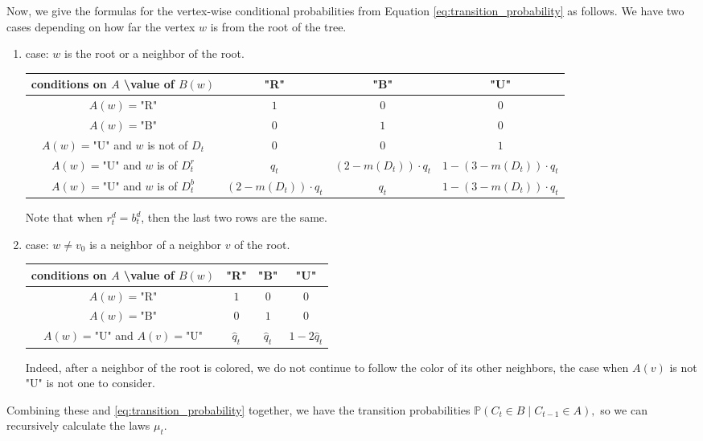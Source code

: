 \documentclass{article}
\theoremstyle{definition}
\newcommand{\bbP}{\mathbb P}
\begin{document}
Now, we give the formulas for the vertex-wise conditional probabilities from Equation \eqref{eq:transition_probability} as follows. We have two cases depending on how far the vertex $w$ is from the root of the tree.

\begin{enumerate}
\item case: $w$ is the root or a neighbor of the root.

\begin{tabular}{|c|c|c|c|}
 \hline
 conditions on $A$ \textbackslash value of $B(w)$& "R" & "B" & "U"\\
 \hline
 $A(w)=$"R" & $1$ & $0$ & $0$ \\
 $A(w)=$"B" & $0$ & $1$ & $0$ \\
 $A(w)=$"U" and $w$ is not of $D_t$ & $0$ & $0$ & $1$ \\
 $A(w)=$"U" and $w$ is of $D_t^r$ & $q_t$ & $(2-m(D_t))\cdot q_t$ & $1-(3-m(D_t))\cdot q_t$ \\
 $A(w)=$"U" and $w$ is of $D_t^b$ & $(2-m(D_t))\cdot q_t$ & $q_t$ & $1-(3-m(D_t))\cdot q_t$ \\
 \hline
\end{tabular}

Note that when $r_t^d=b_t^d$, then the last two rows are the same.

\item case: $w\neq v_0$ is a neighbor of a neighbor $v$ of the root.

\begin{tabular}{|c|c|c|c|}
 \hline
 conditions on $A$ \textbackslash value of $B(w)$& "R" & "B" & "U"\\
 \hline
 $A(w)=$"R" & $1$ & $0$ & $0$ \\
 $A(w)=$"B" & $0$ & $1$ & $0$ \\
 $A(w)=$"U" and $A(v)=$"U" & $\hat q_t$ & $\hat q_t$ & $1-2\hat q_t$\\

 \hline
\end{tabular}

Indeed, after a neighbor of the root is colored, we do not continue to follow the color of its other neighbors, the case when $A(v)$ is not "U" is not one to consider.
\end{enumerate}
Combining these and \eqref{eq:transition_probability} together, we have the transition probabilities $\bbP(C_t\in B\mid C_{t-1}\in A),$ so we can recursively calculate the laws $\mu_t.$ 
\end{document}
